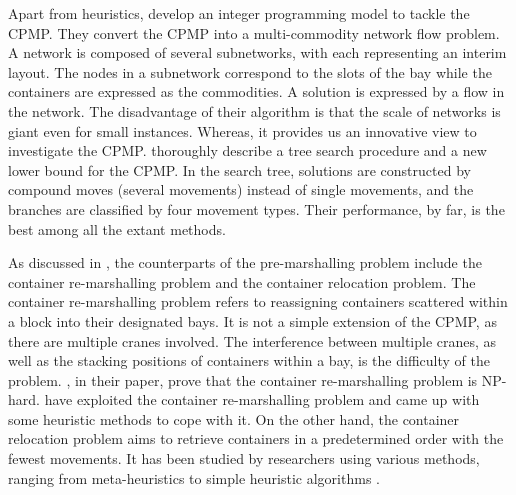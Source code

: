 \documentclass[review,3p,times,authoryear,12pt]{elsarticle}
\begin{document}
Apart from heuristics, \cite{Lee2007} develop an integer programming model to tackle the CPMP. They convert the CPMP into a multi-commodity network flow problem. A network is composed of several subnetworks, with each representing an interim layout.
The nodes in a subnetwork correspond to the slots of the bay while the containers are expressed as the commodities. A solution is expressed by a flow in the network. The disadvantage of their algorithm is that the scale of networks is giant even for small instances.
Whereas, it provides us an innovative view to investigate the CPMP.
\cite{BF2012} thoroughly describe a tree search procedure and a new lower bound for the CPMP. In the search tree, solutions are constructed by compound moves (several movements) instead of single movements, and the branches are classified by four movement types. Their performance, by far, is the best among all the extant methods.

As discussed in \cite{Caserta2011}, the counterparts of the pre-marshalling problem include the container re-marshalling problem and the container relocation problem. The container re-marshalling problem refers to reassigning containers scattered within a block into their designated bays. It is not a simple extension of the CPMP, as there are multiple cranes involved. The interference between multiple cranes, as well as the stacking positions of containers within a bay, is the difficulty of the problem.
\cite{Caserta2011}, in their paper, prove that the container re-marshalling problem is NP-hard. \cite{Kim1998, Kang2006Plan, Park2009Plan, Choe2011} have exploited the container re-marshalling problem and came up with some heuristic methods to cope with it. On the other hand, the container relocation problem aims to retrieve containers in a predetermined order with the fewest movements. It has been studied by researchers using various methods, ranging from meta-heuristics to simple heuristic algorithms \citep{Kim2006A, Yang2006A, Caserta2009A,Caserta2009Applying,Lee2010A,Caserta2012AM, Forster2012A, Zhu2012Iter}.
\end{document}
